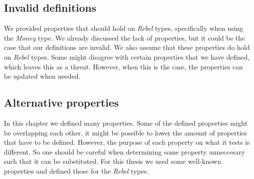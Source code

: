 \subsection*{Invalid definitions}
We provided properties that should hold on \textit{Rebel} types, specifically when using the \textit{Money} type. We already discussed the lack of properties, but it could be the case that our definitions are invalid. We also assume that these properties do hold on \textit{Rebel} types. Some might disagree with certain properties that we have defined, which leaves this as a threat. However, when this is the case, the properties can be updated when needed.

\subsection*{Alternative properties}
In this chapter we defined many properties. Some of the defined properties might be overlapping each other, it might be possible to lower the amount of properties that have to be defined. However, the purpose of each property on what it tests is different. So one should be careful when determining some property unneccesary such that it can be substituted. For this thesis we used some well-known properties and defined those for the \textit{Rebel} types.

